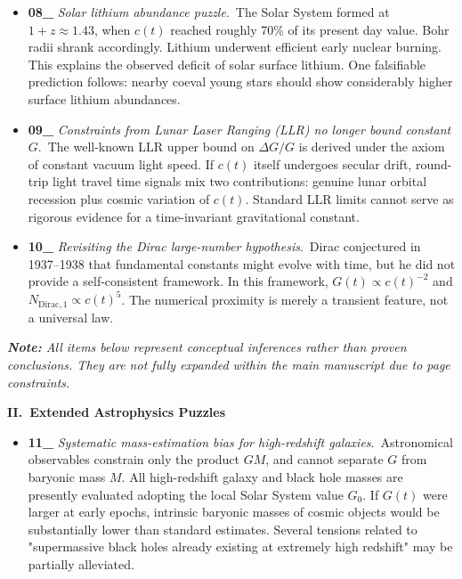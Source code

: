 \documentclass[12pt,leqno]{article}
\begin{document}
{\begin{itemize}
		\item \textbf{08\_} \textit{Solar lithium abundance puzzle}.\,\,\,The Solar System formed at $1+z\approx1.43$, when $c(t)$ reached roughly 70\% of its present day value. Bohr radii shrank accordingly. Lithium underwent efficient early nuclear burning. This explains the observed deficit of solar surface lithium. One falsifiable prediction follows: nearby coeval young stars should show considerably higher surface lithium abundances.
		
		\item \textbf{09\_} \textit{Constraints from Lunar Laser Ranging (LLR) no longer bound constant $G$}.\,\,\,The well-known LLR upper bound on $\Delta G/G$ is derived under the axiom of constant vacuum light speed. If $c(t)$ itself undergoes secular drift, round-trip light travel time signals mix two contributions: genuine lunar orbital recession plus cosmic variation of $c(t)$. Standard LLR limits cannot serve as rigorous evidence for a time-invariant gravitational constant.
		
		\item \textbf{10\_} \textit{Revisiting the Dirac large-number hypothesis}.\,\,\,Dirac conjectured in 1937--1938 that fundamental constants might evolve with time, but he did not provide a self-consistent framework. In this framework, $G(t)\propto c(t)^{-2}$ and $N_\mathrm{Dirac,1}\propto c(t)^5$. The numerical proximity is merely a transient feature, not a universal law. 
	\end{itemize}
	
	
	\bigskip
	\textit{\textbf{Note:} All items below represent conceptual inferences rather than proven conclusions.	They are not fully expanded within the main manuscript due to page constraints.}
	
	
	\medskip
	\bigskip
	\textbf{II.\ Extended Astrophysics Puzzles}
	\begin{itemize}
		\item \textbf{11\_} \textit{Systematic mass-estimation bias for high-redshift galaxies}.\,\,\,Astronomical observables constrain only the product $GM$, and cannot separate $G$ from baryonic mass $M$. All high-redshift galaxy and black hole masses are presently evaluated adopting the local Solar System value $G_0$. If $G(t)$ were larger at early epochs, intrinsic baryonic masses of cosmic objects would be substantially lower than standard estimates. Several tensions related to "supermassive black holes already existing at extremely high redshift" may be partially alleviated.
		

\end{itemize}}
\end{document}
